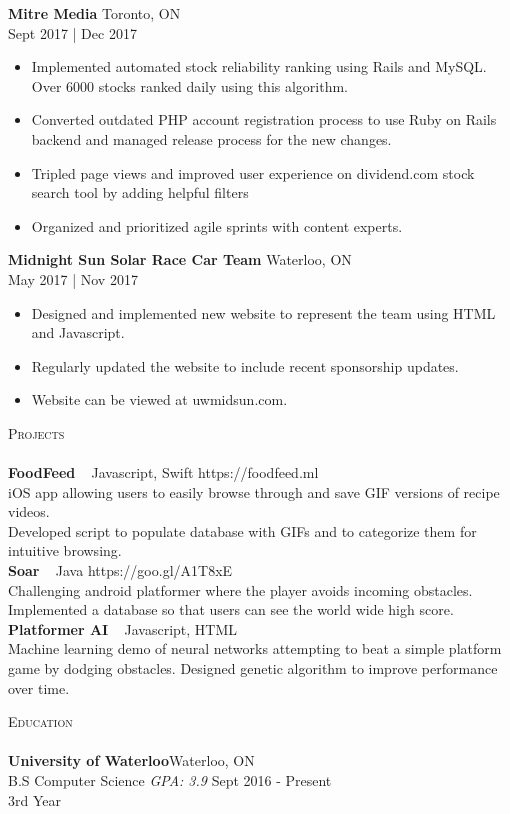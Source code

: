 \documentclass[a4paper]{article}
\newcommand{\lineunder} {
    \vspace*{-8pt} \\
    \hspace*{-18pt} \hrulefill \\
}
\newcommand{\header} [1] {
    {\hspace*{-18pt}\vspace*{6pt} \textsc{#1}}
    \vspace*{-6pt} \lineunder
}
\begin{document}
\textbf{Mitre Media} \hfill Toronto, ON\\
 \hfill Sept 2017 | Dec 2017\\
\vspace{-1mm}
\begin{itemize} \itemsep 1pt
	\item Implemented automated stock reliability ranking using Rails and MySQL. Over 6000 stocks ranked daily using this algorithm.
	\item Converted outdated PHP account registration process to use Ruby on Rails backend and managed release process for the new changes.
	\item Tripled page views and improved user experience on dividend.com stock search tool by adding helpful filters
	\item Organized and prioritized agile sprints with content experts.
\end{itemize}

\textbf{Midnight Sun Solar Race Car Team} \hfill Waterloo, ON\\
 \hfill May 2017 | Nov 2017\\
\vspace{-1mm}
\begin{itemize} \itemsep 1pt
	\item Designed and implemented new website to represent the team using HTML and Javascript.
	\item Regularly updated the website to include recent sponsorship updates.
	\item Website can be viewed at uwmidsun.com.
\end{itemize}

\header{Projects}
{\textbf{FoodFeed}} {\ \textbar{} Javascript, Swift} \hfill https://foodfeed.ml\\
iOS app allowing users to easily browse through and save GIF versions of recipe videos.\\
Developed script to populate database with GIFs and to categorize them for intuitive browsing. \\
\vspace*{2mm}
{\textbf{Soar}} {\ \textbar{} Java} \hfill https://goo.gl/A1T8xE\\
Challenging android platformer where the player avoids incoming obstacles.\\
Implemented a database so that users can see the world wide high score.\\
\vspace*{2mm}
{\textbf{Platformer AI}} {\ \textbar{} Javascript, HTML} \\
Machine learning demo of neural networks attempting to beat a simple platform game by dodging obstacles. Designed genetic algorithm to improve performance over time.\\
\vspace*{2mm}

\header{Education}
\textbf{University of Waterloo}\hfill Waterloo, ON\\
B.S Computer Science \textit{GPA: 3.9} \hfill Sept 2016 - Present\\
3rd Year

\vspace{2mm}

\ 
\end{document}
